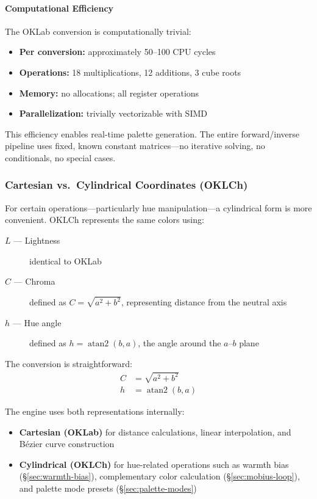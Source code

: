 \paragraph{Computational Efficiency}

The OKLab conversion is computationally trivial:
\begin{itemize}
    \item \textbf{Per conversion:} approximately 50–100 CPU cycles
    \item \textbf{Operations:} 18 multiplications, 12 additions, 3 cube roots
    \item \textbf{Memory:} no allocations; all register operations
    \item \textbf{Parallelization:} trivially vectorizable with SIMD
\end{itemize}

This efficiency enables real-time palette generation. The entire forward/inverse pipeline uses fixed, known constant matrices—no iterative solving, no conditionals, no special cases.

\subsubsection{Cartesian vs.\ Cylindrical Coordinates (OKLCh)}

For certain operations—particularly hue manipulation—a cylindrical form is more convenient. OKLCh represents the same colors using:

\begin{description}
    \item[$L$ --- Lightness] identical to OKLab
    \item[$C$ --- Chroma] defined as $C = \sqrt{a^2 + b^2}$, representing distance from the neutral axis
    \item[$h$ --- Hue angle] defined as $h = \operatorname{atan2}(b, a)$, the angle around the $a$–$b$ plane
\end{description}

The conversion is straightforward:
\begin{align}
    C &= \sqrt{a^2 + b^2} \label{eq:chroma} \\
    h &= \operatorname{atan2}(b, a) \label{eq:hue-angle}
\end{align}

The engine uses both representations internally:
\begin{itemize}
    \item \textbf{Cartesian (OKLab)} for distance calculations, linear interpolation, and Bézier curve construction
    \item \textbf{Cylindrical (OKLCh)} for hue-related operations such as warmth bias (\S\ref{sec:warmth-bias}), complementary color calculation (\S\ref{sec:mobius-loop}), and palette mode presets (\S\ref{sec:palette-modes})
\end{itemize}

